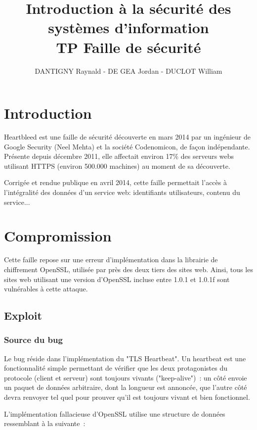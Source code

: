 \documentclass[a4paper,oneside,1pt]{article}
\title{\Huge{Introduction à la sécurité des systèmes d'information}\\
TP Faille de sécurité}
\author{DANTIGNY Raynald - DE GEA Jordan - DUCLOT William}
\begin{document}
\maketitle
\newpage

\section{Introduction}
Heartbleed est une faille de sécurité découverte en mars 2014 par un ingénieur de Google Security (Neel Mehta) et la société Codenomicon, de façon indépendante. Présente depuis décembre 2011, elle affectait environ 17\% des serveurs webs utilisant HTTPS (environ 500.000 machines) au moment de sa découverte.

Corrigée et rendue publique en avril 2014, cette faille permettait l'accès à l'intégralité des données d'un service web: identifiants utilisateurs, contenu du service...

\section{Compromission}
Cette faille repose sur une erreur d'implémentation dans la librairie de chiffrement OpenSSL, utilisée par près des deux tiers des sites web. Ainsi, tous les sites web utilisant une version d'OpenSSL incluse entre 1.0.1 et 1.0.1f sont vulnérables à cette attaque.

\subsection{Exploit}
\subsubsection{Source du bug}
Le bug réside dans l'implémentation du "TLS Heartbeat". Un heartbeat est une fonctionnalité simple permettant de vérifier que les deux protagonistes du protocole (client et serveur) sont toujours vivants ("keep-alive")~: un côté envoie un paquet de données arbitraire, dont la longueur est annoncée, que l'autre côté devra renvoyer tel quel pour prouver qu'il est toujours vivant et bien fonctionnel.

L'implémentation fallacieuse d'OpenSSL utilise une structure de données ressemblant à la suivante~:
\end{document}
